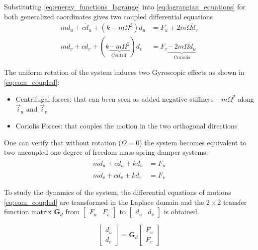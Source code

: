 \documentclass[10pt]{iopart}
\begin{document}
Substituting \eqref{eq:energy_functions_lagrange} into \eqref{eq:lagrangian_equations} for both generalized coordinates gives two coupled differential equations
\begin{subequations}
\label{eq:eom_coupled}
  \begin{align}
    m \ddot{d}_u + c \dot{d}_u + ( k - m \Omega^2 ) d_u &= F_u + 2 m \Omega \dot{d}_v \\
    m \ddot{d}_v + c \dot{d}_v + ( k \underbrace{-\,m \Omega^2}_{\text{Centrif.}} ) d_v &= F_v \underbrace{-\,2 m \Omega \dot{d}_u}_{\text{Coriolis}}
  \end{align}
\end{subequations}

The uniform rotation of the system induces two Gyroscopic effects as shown in \eqref{eq:eom_coupled}:
\begin{itemize}
\item Centrifugal forces: that can been seen as added negative stiffness \(- m \Omega^2\) along \(\vec{i}_u\) and \(\vec{i}_v\)
\item Coriolis Forces: that couples the motion in the two orthogonal directions
\end{itemize}

One can verify that without rotation (\(\Omega = 0\)) the system becomes equivalent to two uncoupled one degree of freedom mass-spring-damper systems:
\begin{subequations}
\label{eq:oem_no_rotation}
  \begin{align}
    m \ddot{d}_u + c \dot{d}_u + k d_u &= F_u \\
    m \ddot{d}_v + c \dot{d}_v + k d_v &= F_v
  \end{align}
\end{subequations}

\par
To study the dynamics of the system, the differential equations of motions \eqref{eq:eom_coupled} are transformed in the Laplace domain and the \(2 \times 2\) transfer function matrix \(\mathbf{G}_d\) from \(\begin{bmatrix}F_u & F_v\end{bmatrix}\) to \(\begin{bmatrix}d_u & d_v\end{bmatrix}\) is obtained.

\begin{equation}
\label{eq:Gd_mimo_tf}
  \begin{bmatrix} d_u \\ d_v \end{bmatrix} = \mathbf{G}_d \begin{bmatrix} F_u \\ F_v \end{bmatrix}
\end{equation}
\end{document}
